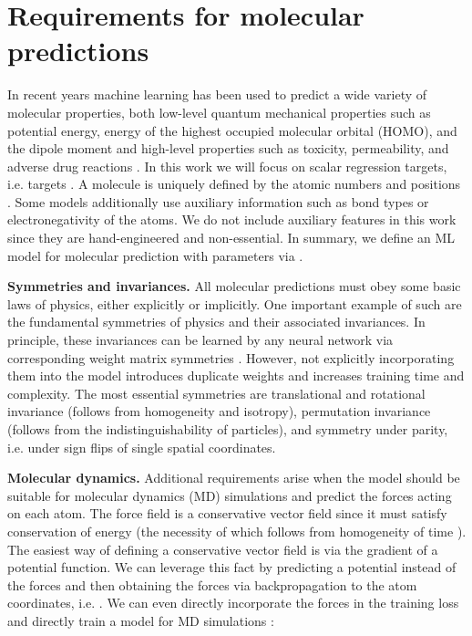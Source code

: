 \documentclass{article} \usepackage{iclr2020_conference,times}
\begin{document}
\section{Requirements for molecular predictions} \label{sec:req}

In recent years machine learning has been used to predict a wide variety of molecular properties, both low-level quantum mechanical properties such as potential energy, energy of the highest occupied molecular orbital (HOMO), and the dipole moment and high-level properties such as toxicity, permeability, and adverse drug reactions \citep{wu_moleculenet:_2018}. In this work we will focus on scalar regression targets, i.e. targets . A molecule is uniquely defined by the atomic numbers  and positions . Some models additionally use auxiliary information  such as bond types or electronegativity of the atoms. We do not include auxiliary features in this work since they are hand-engineered and non-essential. In summary, we define an ML model for molecular prediction with parameters  via .

\textbf{Symmetries and invariances.} All molecular predictions must obey some basic laws of physics, either explicitly or implicitly. One important example of such are the fundamental symmetries of physics and their associated invariances. In principle, these invariances can be learned by any neural network via corresponding weight matrix symmetries \citep{ravanbakhsh_equivariance_2017}. However, not explicitly incorporating them into the model introduces duplicate weights and increases training time and complexity. The most essential symmetries are translational and rotational invariance (follows from homogeneity and isotropy), permutation invariance (follows from the indistinguishability of particles), and symmetry under parity, i.e. under sign flips of single spatial coordinates.

\textbf{Molecular dynamics.} Additional requirements arise when the model should be suitable for molecular dynamics (MD) simulations and predict the forces  acting on each atom. The force field is a conservative vector field since it must satisfy conservation of energy (the necessity of which follows from homogeneity of time \citep{noether_invariante_1918}). The easiest way of defining a conservative vector field is via the gradient of a potential function. We can leverage this fact by predicting a potential instead of the forces and then obtaining the forces via backpropagation to the atom coordinates, i.e. . We can even directly incorporate the forces in the training loss and directly train a model for MD simulations \citep{pukrittayakamee_simultaneous_2009}:
\end{document}
